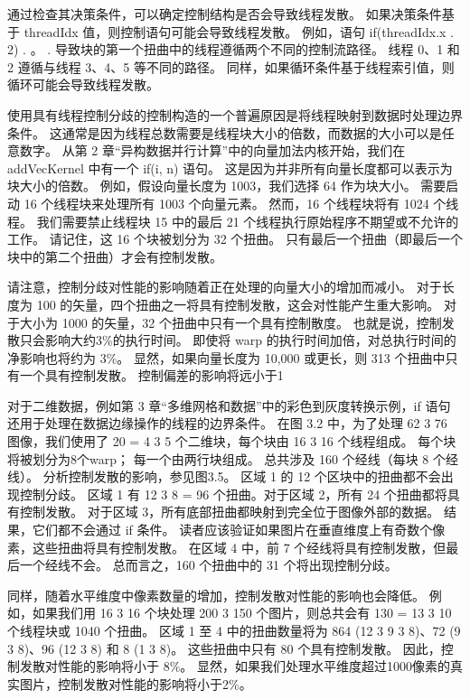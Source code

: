 通过检查其决策条件，可以确定控制结构是否会导致线程发散。 如果决策条件基于 threadIdx 值，则控制语句可能会导致线程发散。 例如，语句 if(threadIdx.x . 2) {. 。 .} 导致块的第一个扭曲中的线程遵循两个不同的控制流路径。 线程 0、1 和 2 遵循与线程 3、4、5 等不同的路径。 同样，如果循环条件基于线程索引值，则循环可能会导致线程发散。

使用具有线程控制分歧的控制构造的一个普遍原因是将线程映射到数据时处理边界条件。 这通常是因为线程总数需要是线程块大小的倍数，而数据的大小可以是任意数字。 从第 2 章“异构数据并行计算”中的向量加法内核开始，我们在 addVecKernel 中有一个 if(i, n) 语句。 这是因为并非所有向量长度都可以表示为块大小的倍数。 例如，假设向量长度为 1003，我们选择 64 作为块大小。 需要启动 16 个线程块来处理所有 1003 个向量元素。 然而，16 个线程块将有 1024 个线程。 我们需要禁止线程块 15 中的最后 21 个线程执行原始程序不期望或不允许的工作。 请记住，这 16 个块被划分为 32 个扭曲。 只有最后一个扭曲（即最后一个块中的第二个扭曲）才会有控制发散。

请注意，控制分歧对性能的影响随着正在处理的向量大小的增加而减小。 对于长度为 100 的矢量，四个扭曲之一将具有控制发散，这会对性能产生重大影响。 对于大小为 1000 的矢量，32 个扭曲中只有一个具有控制散度。 也就是说，控制发散只会影响大约3\%的执行时间。 即使将 warp 的执行时间加倍，对总执行时间的净影响也将约为 3\%。 显然，如果向量长度为 10,000 或更长，则 313 个扭曲中只有一个具有控制发散。 控制偏差的影响将远小于1%

对于二维数据，例如第 3 章“多维网格和数据”中的彩色到灰度转换示例，if 语句还用于处理在数据边缘操作的线程的边界条件。 在图 3.2 中，为了处理 62 3 76 图像，我们使用了 20 = 4 3 5 个二维块，每个块由 16 3 16 个线程组成。 每个块将被划分为8个warp； 每一个由两行块组成。 总共涉及 160 个经线（每块 8 个经线）。 分析控制发散的影响，参见图3.5。 区域 1 的 12 个区块中的扭曲都不会出现控制分歧。 区域 1 有 12 3 8 = 96 个扭曲。对于区域 2，所有 24 个扭曲都将具有控制发散。 对于区域 3，所有底部扭曲都映射到完全位于图像外部的数据。 结果，它们都不会通过 if 条件。 读者应该验证如果图片在垂直维度上有奇数个像素，这些扭曲将具有控制发散。 在区域 4 中，前 7 个经线将具有控制发散，但最后一个经线不会。 总而言之，160 个扭曲中的 31 个将出现控制分歧。

同样，随着水平维度中像素数量的增加，控制发散对性能的影响也会降低。 例如，如果我们用 16 3 16 个块处理 200 3 150 个图片，则总共会有 130 = 13 3 10 个线程块或 1040 个扭曲。 区域 1 至 4 中的扭曲数量将为 864 (12 3 9 3 8)、72 (9 3 8)、96 (12 3 8) 和 8 (1 3 8)。 这些扭曲中只有 80 个具有控制发散。 因此，控制发散对性能的影响将小于 8\%。 显然，如果我们处理水平维度超过1000像素的真实图片，控制发散对性能的影响将小于2\%。


